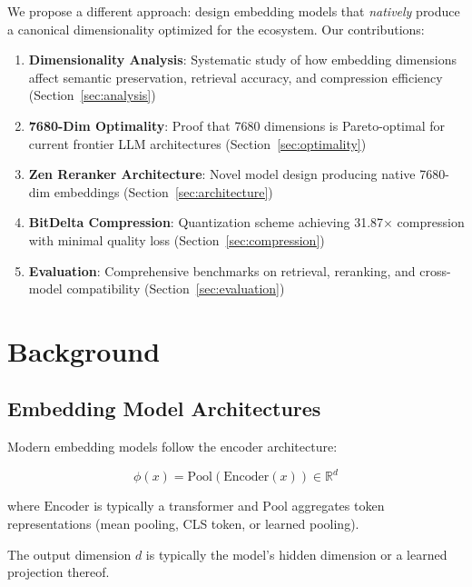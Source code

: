 \documentclass[11pt,letterpaper]{article}
\begin{document}
We propose a different approach: design embedding models that \emph{natively} produce a canonical dimensionality optimized for the ecosystem. Our contributions:

\begin{enumerate}
    \item \textbf{Dimensionality Analysis}: Systematic study of how embedding dimensions affect semantic preservation, retrieval accuracy, and compression efficiency (Section~\ref{sec:analysis})

    \item \textbf{7680-Dim Optimality}: Proof that 7680 dimensions is Pareto-optimal for current frontier LLM architectures (Section~\ref{sec:optimality})

    \item \textbf{Zen Reranker Architecture}: Novel model design producing native 7680-dim embeddings (Section~\ref{sec:architecture})

    \item \textbf{BitDelta Compression}: Quantization scheme achieving 31.87$\times$ compression with minimal quality loss (Section~\ref{sec:compression})

    \item \textbf{Evaluation}: Comprehensive benchmarks on retrieval, reranking, and cross-model compatibility (Section~\ref{sec:evaluation})
\end{enumerate}

\section{Background}

\subsection{Embedding Model Architectures}

Modern embedding models follow the encoder architecture:

\begin{equation}
\phi(x) = \text{Pool}(\text{Encoder}(x)) \in \mathbb{R}^d
\end{equation}

where $\text{Encoder}$ is typically a transformer and $\text{Pool}$ aggregates token representations (mean pooling, CLS token, or learned pooling).

The output dimension $d$ is typically the model's hidden dimension or a learned projection thereof.
\end{document}
